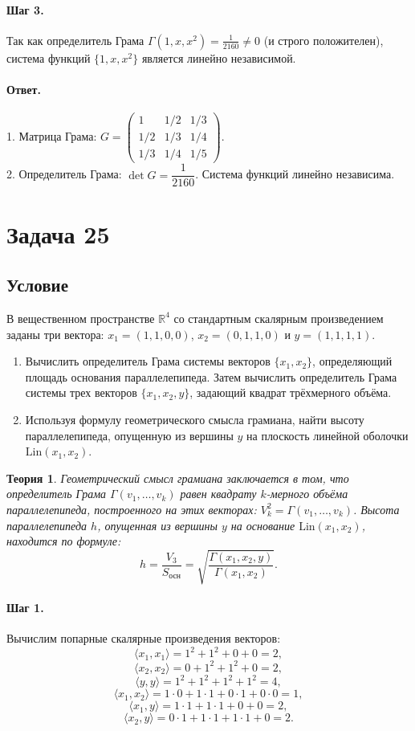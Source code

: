 \documentclass[12pt,a4paper]{article}
\theoremstyle{solution}
\newtheorem*{theory}{Теория}
\newcommand{\task}[1]{\newpage\section*{Задача #1}}
\newcommand{\answer}{\paragraph{Ответ.}}
\newcommand{\step}[1]{\paragraph{Шаг #1.}}
\newcommand{\R}{\mathbb{R}}
\begin{document}
\step{3} Так как определитель Грама $\Gamma(1, x, x^2) = \frac{1}{2160} \neq 0$ (и строго положителен), система функций $\{1, x, x^2\}$ является линейно независимой.

\answer
1. Матрица Грама: $G = \begin{pmatrix} 1 & 1/2 & 1/3 \\ 1/2 & 1/3 & 1/4 \\ 1/3 & 1/4 & 1/5 \end{pmatrix}$.\\
2. Определитель Грама: $\det G = \dfrac{1}{2160}$. Система функций линейно независима.

\task{25}
\subsection*{Условие}
В вещественном пространстве $\R^4$ со стандартным скалярным произведением заданы три вектора: $x_1 = (1, 1, 0, 0)$, $x_2 = (0, 1, 1, 0)$ и $y = (1, 1, 1, 1)$.
\begin{enumerate}
    \item Вычислить определитель Грама системы векторов $\{x_1, x_2\}$, определяющий площадь основания параллелепипеда. Затем вычислить определитель Грама системы трех векторов $\{x_1, x_2, y\}$, задающий квадрат трёхмерного объёма.
    \item Используя формулу геометрического смысла грамиана, найти высоту параллелепипеда, опущенную из вершины $y$ на плоскость линейной оболочки $\mathrm{Lin}(x_1, x_2)$.
\end{enumerate}

\begin{theory}
Геометрический смысл грамиана заключается в том, что определитель Грама $\Gamma(v_1, \ldots, v_k)$ равен квадрату $k$-мерного объёма параллелепипеда, построенного на этих векторах: $V_k^2 = \Gamma(v_1, \ldots, v_k)$. Высота параллелепипеда $h$, опущенная из вершины $y$ на основание $\mathrm{Lin}(x_1, x_2)$, находится по формуле:
\[
h = \frac{V_3}{S_{\text{осн}}} = \sqrt{\frac{\Gamma(x_1, x_2, y)}{\Gamma(x_1, x_2)}}.
\]
\end{theory}

\step{1} Вычислим попарные скалярные произведения векторов:
\[
\langle x_1, x_1\rangle = 1^2 + 1^2 + 0 + 0 = 2,
\]
\[
\langle x_2, x_2\rangle = 0 + 1^2 + 1^2 + 0 = 2,
\]
\[
\langle y, y\rangle = 1^2 + 1^2 + 1^2 + 1^2 = 4,
\]
\[
\langle x_1, x_2\rangle = 1\cdot 0 + 1\cdot 1 + 0\cdot 1 + 0\cdot 0 = 1,
\]
\[
\langle x_1, y\rangle = 1\cdot 1 + 1\cdot 1 + 0 + 0 = 2,
\]
\[
\langle x_2, y\rangle = 0\cdot 1 + 1\cdot 1 + 1\cdot 1 + 0 = 2.
\]
\end{document}

